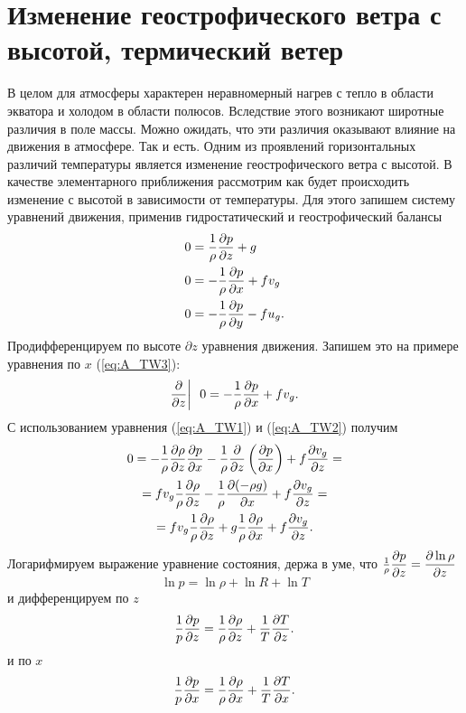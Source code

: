 \chapter{{\color{done}Изменение геострофического ветра с высотой, термический ветер}}

В целом для атмосферы характерен неравномерный нагрев с тепло в области экватора и холодом в области полюсов. Вследствие этого возникают широтные различия в поле массы. Можно ожидать, что эти различия оказывают влияние на движения в атмосфере. Так и есть. Одним из проявлений горизонтальных различий температуры является изменение геострофического ветра с высотой. В качестве элементарного приближения рассмотрим как будет происходить изменение с высотой в зависимости от температуры. Для этого запишем систему уравнений движения, применив гидростатический и геострофический балансы
\begin{align}    
    0 &= \frac{1}{\rho}\displaystyle\frac{\partial p}{\partial z}+g  \label{eq:A_TW1}  \\
    0 &= -\frac{1}{\rho}\displaystyle\frac{\partial p}{\partial x}+fv_g  \label{eq:A_TW2}  \\ 
    0 &= -\frac{1}{\rho}\displaystyle\frac{\partial p}{\partial y}-fu_g  \label{eq:A_TW3}.
\end{align}
Продифференцируем по высоте $\partial z$ уравнения движения. Запишем это на примере уравнения по $x$ (\ref{eq:A_TW3}):
\begin{equation*}
    \displaystyle\frac{\partial }{\partial z} \bigg| \:\:\: 0 = -\frac{1}{\rho}\displaystyle\frac{\partial p}{\partial x}+fv_g .
\end{equation*}
С использованием уравнения (\ref{eq:A_TW1}) и (\ref{eq:A_TW2}) получим
\begin{multline}
   0 = -\frac{1}{\rho}\displaystyle\frac{\partial \rho}{\partial z}\displaystyle\frac{\partial p}{\partial x}-
    \frac{1}{\rho} \displaystyle\frac{\partial }{\partial z} \displaystyle \left(  \displaystyle\frac{\partial p}{\partial x}  \right) + 
    f\displaystyle\frac{\partial v_g}{\partial z} = \\
  = fv_g\frac{1}{\rho}\displaystyle\frac{\partial \rho}{\partial z}-
    \frac{1}{\rho} \displaystyle\frac{\partial (-\rho g)}{\partial x} + 
    f\displaystyle\frac{\partial v_g}{\partial z} = \\
  = fv_g\frac{1}{\rho}\displaystyle\frac{\partial \rho}{\partial z}  + 
          g\frac{1}{\rho}\displaystyle\frac{\partial \rho}{\partial x} + 
          f\displaystyle\frac{\partial v_g}{\partial z}. \label{eq:A_TW4}
\end{multline}
Логарифмируем выражение уравнение состояния, держа в уме, что $\frac{1}{\rho}\displaystyle\frac{\partial p}{\partial z}=\displaystyle\frac{\partial \ln{\rho}}{\partial z}$
\begin{equation*}
    \ln{p} = \ln{\rho} + \ln{R} + \ln{T}
\end{equation*}
и дифференцируем по $z$ 
\begin{equation}
    \frac{1}{p}\displaystyle\frac{\partial p}{\partial z} = \frac{1}{\rho}\displaystyle\frac{\partial \rho}{\partial z} + \frac{1}{T}\displaystyle\frac{\partial T}{\partial z}. \label{eq:A_TW5}
\end{equation}
и по $x$
\begin{equation}
    \frac{1}{p}\displaystyle\frac{\partial p}{\partial x} = \frac{1}{\rho}\displaystyle\frac{\partial \rho}{\partial x} + \frac{1}{T}\displaystyle\frac{\partial T}{\partial x}. \label{eq:A_TW5}
\end{equation}


